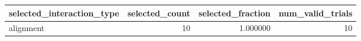 \begin{tabular}{lrrr}
\toprule
selected_interaction_type & selected_count & selected_fraction & num_valid_trials \\
\midrule
alignment & 10 & 1.000000 & 10 \\
\bottomrule
\end{tabular}
